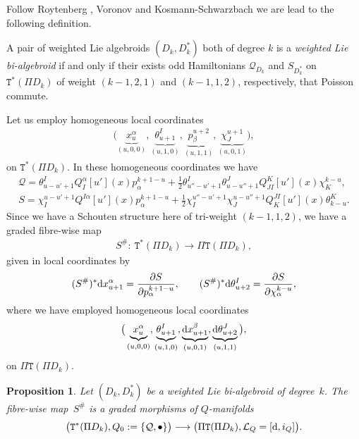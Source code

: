 \documentclass[pdftex]{sigma}
\newcommand{\rmd}{\textnormal{d}}
\def\sT{{\mathtt T}}
\numberwithin{equation}{section}
\newtheorem{Proposition}[Theorem]{Proposition}
 { \theoremstyle{definition}
\newtheorem{Definition}[Theorem]{Definition}
\newtheorem{Example}[Theorem]{Example}
\newtheorem{Remark}[Theorem]{Remark} }
\begin{document}
Follow Roytenberg \cite{Roytenberg:2001}, Voronov \cite{Voronov:2001qf} and Kosmann-Schwarzbach  \cite{Kosmann-Schwarzbach:1995}  we are lead to the following def\/inition.

\begin{Definition}
A pair of weighted Lie algebroids $(D_{k}, D_{k}^{*})$  both of degree $k$  is a \emph{weighted Lie bi-algebroid} if and only if their exists odd Hamiltonians $\mathcal{Q}_{D_{k}}$ and $S_{D_{k}^{*}}$  on $\sT^{*}(\Pi D_{k})$ of weight $(k-1, 2,1)$ and $(k-1, 1,2)$, respectively,  that Poisson commute.
\end{Definition}

Let us employ homogeneous local coordinates
\begin{gather*}
\big( \underbrace{x_{u}^{\alpha}}_{(u,0,0)},  \underbrace{\theta_{u+1}^{I}}_{(u,1,0)},   \underbrace{p_{\beta}^{u+2}}_{(u,1,1)},   \underbrace{\chi_{J}^{u+1}}_{(u,0,1)} \big),
\end{gather*}
on $\sT^{*}(\Pi D_{k})$. In these homogeneous coordinates we have
\begin{gather*}
\mathcal{Q} = \theta_{u-u'+1}^{I} Q_{I}^{\alpha}[u'](x)p_{\alpha}^{k+1-u} + \frac{1}{2} \theta_{u''-u'+1}^{I} \theta_{u-u''+1}^{J}Q_{JI}^{K}[u'](x) \chi_{K}^{k-u},\\
S  = \chi_{I}^{u-u'+1} Q^{I \alpha}[u'](x) p_{\alpha}^{k+1-u} + \frac{1}{2}\chi_{I}^{u''-u'+1}\chi_{J}^{u-u''+1}Q_{K}^{JI}[u'](x)\theta_{k-u}^{K}.
\end{gather*}
Since we have a Schouten structure here of tri-weight $(k-1,1,2)$, we have a graded f\/ibre-wise map
\begin{gather*}
S^{\#} \colon \ \sT^{*}(\Pi D_{k}) \longrightarrow \Pi \sT(\Pi D_{k}),
\end{gather*}
given in local coordinates by
\begin{gather*}
(S^{\#})^{*}\rmd x^{\alpha}_{u+1}  =  \frac{\partial S}{\partial p_{\alpha}^{k+1-u}  }  ,\qquad
  (S^{\#})^{*} \rmd\theta_{u+2}^{I}  =   \frac{\partial S }{\partial \chi_{\alpha}^{k-u}},
\end{gather*}
where we have employed homogeneous local coordinates
\begin{gather*}
\big( \underbrace{x_{u}^{\alpha}}_{(u,0,0)},   \underbrace{\theta_{u+1}^{I}}_{(u,1,0)},   \underbrace{\rmd x^{\beta}_{u+1}}_{(u,0,1)},  \underbrace{\rmd\theta^{J}_{u+2}}_{(u,1,1)} \big),
\end{gather*}
on $\Pi\sT(\Pi D_{k})$.

\begin{Proposition}
Let $(D_{k}, D_{k}^{*})$ be a weighted Lie  bi-algebroid of degree~$k$. The fibre-wise map~$S^{\#}$ is a graded morphisms of $Q$-manifolds
\begin{gather*}
\big(\sT^{*}(\Pi D_{k}),   Q_{0} :=  \{\mathcal{Q} , \bullet \} \big) \longrightarrow \big( \Pi \sT(\Pi D_{k}),   \mathcal{L}_{Q} = [\rmd, i_{Q}] \big).
\end{gather*}
\end{Proposition}
\end{document}
